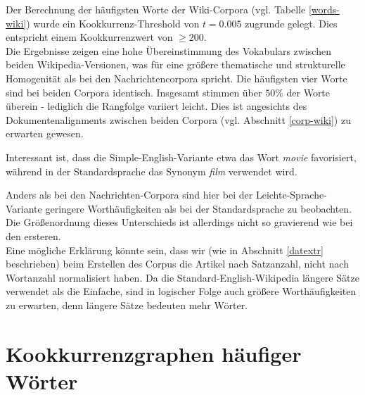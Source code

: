 \documentclass[11pt, a4paper]{article}
\begin{document}
Der Berechnung der häufigsten Worte der Wiki-Corpora (vgl. Tabelle
\ref{words-wiki}) wurde ein Kookkurrenz-Threshold von $t=0.005$ zugrunde gelegt.
Dies entspricht einem Kookkurrenzwert von $\geq 200$.\\
Die Ergebnisse zeigen eine hohe Übereinstimmung des Vokabulars zwischen beiden
Wikipedia-Versionen, was für eine größere thematische und strukturelle
Homogenität als bei den Nachrichtencorpora spricht.
Die häufigsten vier Worte sind bei beiden Corpora identisch.
Insgesamt stimmen über $50\%$ der Worte überein - lediglich die Rangfolge
variiert leicht.
Dies ist angesichts des Dokumentenalignments zwischen beiden Corpora (vgl.
Abschnitt \ref{corp-wiki}) zu erwarten gewesen.

Interessant ist, dass die Simple-English-Variante etwa das Wort \textit{movie}
favorisiert, während in der Standardsprache das Synonym \textit{film} verwendet
wird.

Anders als bei den Nachrichten-Corpora sind hier bei der Leichte-Sprache-Variante
geringere Worthäufigkeiten als bei der Standardsprache zu beobachten.
Die Größenordnung dieses Unterschieds ist allerdings nicht so gravierend wie bei
den ersteren.\\
Eine mögliche Erklärung könnte sein, dass wir (wie in Abschnitt \ref{datextr}
beschrieben) beim Erstellen des Corpus die Artikel nach Satzanzahl, nicht nach
Wortanzahl normalisiert haben.
Da die Standard-English-Wikipedia längere Sätze verwendet als die Einfache,
sind in logischer Folge auch größere Worthäufigkeiten zu erwarten, denn längere
Sätze bedeuten mehr Wörter.



\section{Kookkurrenzgraphen häufiger Wörter}
\end{document}
